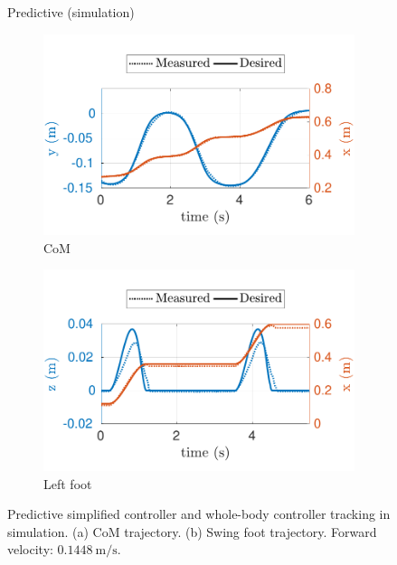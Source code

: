 \begin{figure}[t]
     \begin{myframe}{Predictive (simulation)}
    \begin{subfigure}[b]{0.49\textwidth}
        \centering
        \includegraphics[width=\textwidth]{chapter_wbc_benchmarking/figures/mpc_torq_sim-min_vel-com.pdf}
        \caption{CoM}
        \label{fig:mpc_torq_sim-min_vel-com}
    \end{subfigure}
    \begin{subfigure}[b]{0.49\textwidth}
        \centering
        \includegraphics[width=\textwidth]{chapter_wbc_benchmarking/figures/mpc_torq_sim-min_vel-lf.pdf}
        \caption{Left foot}
        \label{fig:mpc_torq_sim-min_vel-lf}
    \end{subfigure} 
    \end{myframe}
    \caption[Predictive simplified controller and whole-body controller tracking (simulation)]{Predictive simplified controller and whole-body controller tracking in simulation. (a) CoM trajectory. (b) Swing foot trajectory. Forward velocity: $\SI{0.1448}{\meter\per\second}$.}
\end{figure}





